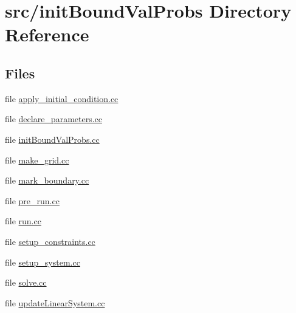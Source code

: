 \section{src/init\-Bound\-Val\-Probs Directory Reference}
\label{dir_0492cce411d358cb2973b5739a19c688}
\subsection*{Files}
\begin{DoxyCompactItemize}
\item 
file \hyperlink{apply__initial__condition_8cc}{apply\-\_\-initial\-\_\-condition.\-cc}
\item 
file \hyperlink{init_bound_val_probs_2declare__parameters_8cc}{declare\-\_\-parameters.\-cc}
\item 
file \hyperlink{init_bound_val_probs_8cc}{init\-Bound\-Val\-Probs.\-cc}
\item 
file \hyperlink{make__grid_8cc}{make\-\_\-grid.\-cc}
\item 
file \hyperlink{mark__boundary_8cc}{mark\-\_\-boundary.\-cc}
\item 
file \hyperlink{pre__run_8cc}{pre\-\_\-run.\-cc}
\item 
file \hyperlink{run_8cc}{run.\-cc}
\item 
file \hyperlink{setup__constraints_8cc}{setup\-\_\-constraints.\-cc}
\item 
file \hyperlink{setup__system_8cc}{setup\-\_\-system.\-cc}
\item 
file \hyperlink{solve_8cc}{solve.\-cc}
\item 
file \hyperlink{update_linear_system_8cc}{update\-Linear\-System.\-cc}
\end{DoxyCompactItemize}
